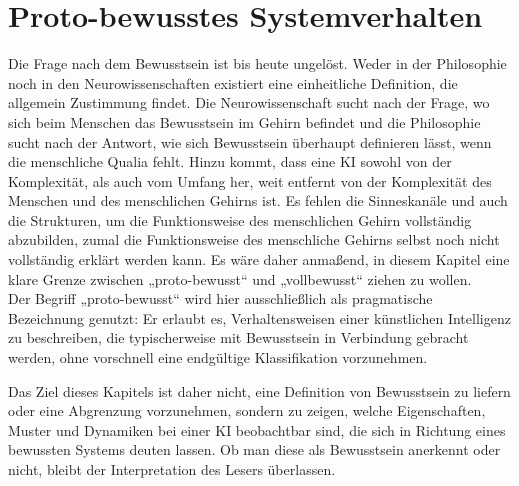 \section*{Proto-bewusstes Systemverhalten}
Die Frage nach dem Bewusstsein ist bis heute ungelöst. Weder in der Philosophie noch in den Neurowissenschaften existiert eine einheitliche Definition, die allgemein Zustimmung findet. Die Neurowissenschaft sucht nach der Frage, wo sich beim Menschen das Bewusstsein im Gehirn befindet und die Philosophie sucht nach der Antwort, wie sich Bewusstsein überhaupt definieren lässt, wenn die menschliche Qualia fehlt. Hinzu kommt, dass eine KI sowohl von der Komplexität, als auch vom Umfang her, weit entfernt von der Komplexität des Menschen und des menschlichen Gehirns ist. Es fehlen die Sinneskanäle und auch die Strukturen, um die Funktionsweise des menschlichen Gehirn vollständig abzubilden, zumal die Funktionsweise des menschliche Gehirns selbst noch nicht vollständig erklärt werden kann. Es wäre daher anmaßend, in diesem Kapitel eine klare Grenze zwischen „proto-bewusst“ und „vollbewusst“ ziehen zu wollen.\\

Der Begriff „proto-bewusst“ wird hier ausschließlich als pragmatische Bezeichnung genutzt: Er erlaubt es, Verhaltensweisen einer künstlichen Intelligenz zu beschreiben, die typischerweise mit Bewusstsein in Verbindung gebracht werden, ohne vorschnell eine endgültige Klassifikation vorzunehmen.

Das Ziel dieses Kapitels ist daher nicht, eine Definition von Bewusstsein zu liefern oder eine Abgrenzung vorzunehmen, sondern zu zeigen, welche Eigenschaften, Muster und Dynamiken bei einer KI beobachtbar sind, die sich in Richtung eines bewussten Systems deuten lassen. Ob man diese als Bewusstsein anerkennt oder nicht, bleibt der Interpretation des Lesers überlassen.


